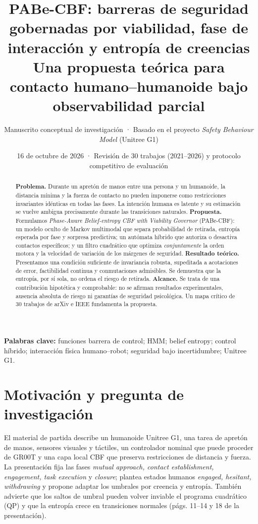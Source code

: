 \documentclass[10pt,a4paper,twocolumn]{article}
\title{\vspace{-1.3cm}\bfseries\color{ink}PABe-CBF: barreras de seguridad gobernadas por viabilidad, fase de interacción y entropía de creencias\\[-2pt]
\large\normalfont\color{accent}Una propuesta teórica para contacto humano--humanoide bajo observabilidad parcial}
\author{\small Manuscrito conceptual de investigación · Basado en el proyecto \emph{Safety Behaviour Model} (Unitree G1)}
\date{\small 16 de octubre de 2026 · Revisión de 30 trabajos (2021--2026) y protocolo competitivo de evaluación}
\begin{document}
\maketitle
\vspace{-0.7cm}
\begin{abstract}
\noindent\textbf{Problema.} Durante un apretón de manos entre una persona y un humanoide, la distancia mínima y la fuerza de contacto no pueden imponerse como restricciones invariantes idénticas en todas las fases. La intención humana es latente y su estimación se vuelve ambigua precisamente durante las transiciones naturales. \textbf{Propuesta.} Formulamos \emph{Phase-Aware Belief-entropy CBF with Viability Governor} (PABe-CBF): un modelo oculto de Markov multimodal que separa probabilidad de retirada, entropía esperada por fase y sorpresa predictiva; un autómata híbrido que autoriza o desactiva contactos específicos; y un filtro cuadrático que optimiza \emph{conjuntamente} la orden motora y la velocidad de variación de los márgenes de seguridad. \textbf{Resultado teórico.} Presentamos una condición suficiente de invariancia robusta, supeditada a acotaciones de error, factibilidad continua y conmutaciones admisibles. Se demuestra que la entropía, por sí sola, no ordena el riesgo de retirada. \textbf{Alcance.} Se trata de una contribución hipotética y comprobable: no se afirman resultados experimentales, ausencia absoluta de riesgo ni garantías de seguridad psicológica. Un mapa crítico de 30 trabajos de arXiv e IEEE fundamenta la propuesta.
\end{abstract}
\vspace{4pt}
\noindent\textbf{Palabras clave:} funciones barrera de control; HMM; belief entropy; control híbrido; interacción física humano--robot; seguridad bajo incertidumbre; Unitree G1.

\section{Motivación y pregunta de investigación}
El material de partida describe un humanoide Unitree G1, una tarea de apretón de manos, sensores visuales y táctiles, un controlador nominal que puede proceder de GR00T y una capa local CBF que preserva restricciones de distancia y fuerza. La presentación fija las fases \emph{mutual approach, contact establishment, engagement, task execution} y \emph{closure}; plantea estados humanos \emph{engaged, hesitant, withdrawing} y propone adaptar los umbrales por creencia y entropía. También advierte que los saltos de umbral pueden volver inviable el programa cuadrático (QP) y que la entropía crece en transiciones normales (págs. 11--14 y 18 de la presentación).
\end{document}

